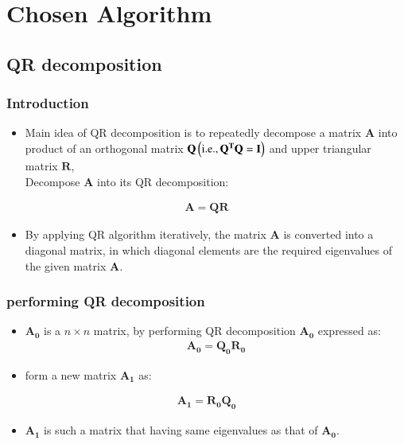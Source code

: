 \documentclass[journal]{IEEEtran}
\begin{document}
\section{Chosen Algorithm}
\subsection{QR decomposition\\}
\subsubsection{Introduction\\}
\begin{itemize}
    \item Main idea of QR decomposition is to repeatedly decompose a matrix $\mathbf{A}$ into product of an orthogonal matrix $\mathbf{Q} \left(\text{i.e}.,\mathbf{Q^{T}Q=I}\right)$ and upper triangular matrix $\mathbf{R}$, \\
    
    Decompose $\mathbf{A}$ into its QR decomposition:
\end{itemize}
\begin{align*}
    \mathbf{A=QR}
\end{align*}
\begin{itemize}
    \item By applying QR algorithm iteratively, the matrix $\mathbf{A}$ is converted into a diagonal matrix, in which diagonal elements are the required eigenvalues of the given matrix $\mathbf{A}$.\\ 
\end{itemize}

\subsubsection{performing QR decomposition\\}
\begin{itemize}
    \item $\mathbf{A_0}$ is a $n \times n$ matrix, by performing QR decomposition $\mathbf{A_0}$ expressed as:
    \begin{align*}
        \mathbf{A_0 = Q_{0}R_{0}}
    \end{align*}
    \item form a new matrix $\mathbf{A_1}$ as:
    
\end{itemize}
\begin{align*}
    \mathbf{A_1 = R_{0}Q_{0}}
\end{align*}
\begin{itemize}
    \item $\mathbf{A_1}$ is such a matrix that having same eigenvalues as that of $\mathbf{A_{0}}$.
    \\
\end{itemize}
\end{document}
